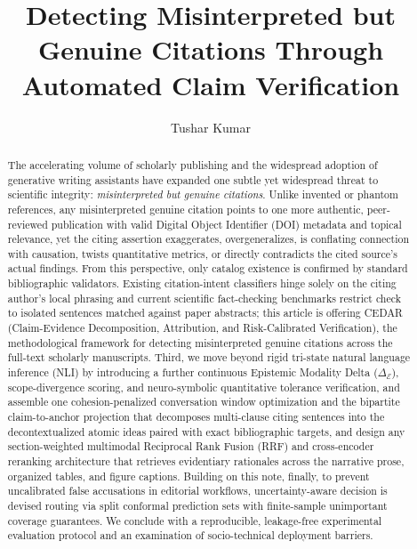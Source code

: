 \documentclass[sigconf]{acmart}
\begin{document}
\title{Detecting Misinterpreted but Genuine Citations Through Automated Claim Verification}

\author{Tushar Kumar}

\begin{abstract}
The accelerating volume of scholarly publishing and the widespread adoption of generative writing assistants have expanded one subtle yet widespread threat to scientific integrity: \emph{misinterpreted but genuine citations}. Unlike invented or phantom references, any misinterpreted genuine citation points to one more authentic, peer-reviewed publication with valid Digital Object Identifier (DOI) metadata and topical relevance, yet the citing assertion exaggerates, overgeneralizes, is conflating connection with causation, twists quantitative metrics, or directly contradicts the cited source's actual findings. From this perspective, only catalog existence is confirmed by standard bibliographic validators. Existing citation-intent classifiers hinge solely on the citing author's local phrasing and current scientific fact-checking benchmarks restrict check to isolated sentences matched against paper abstracts; this article is offering CEDAR (Claim-Evidence Decomposition, Attribution, and Risk-Calibrated Verification), the methodological framework for detecting misinterpreted genuine citations across the full-text scholarly manuscripts. Third, we move beyond rigid tri-state natural language inference (NLI) by introducing a further continuous Epistemic Modality Delta ($\Delta_{\mathcal{E}}$), scope-divergence scoring, and neuro-symbolic quantitative tolerance verification, and assemble one cohesion-penalized conversation window optimization and the bipartite claim-to-anchor projection that decomposes multi-clause citing sentences into the decontextualized atomic ideas paired with exact bibliographic targets, and design any section-weighted multimodal Reciprocal Rank Fusion (RRF) and cross-encoder reranking architecture that retrieves evidentiary rationales across the narrative prose, organized tables, and figure captions. Building on this note, finally, to prevent uncalibrated false accusations in editorial workflows, uncertainty-aware decision is devised routing via split conformal prediction sets with finite-sample unimportant coverage guarantees. We conclude with a reproducible, leakage-free experimental evaluation protocol and an examination of socio-technical deployment barriers.
\end{abstract}
\end{document}
